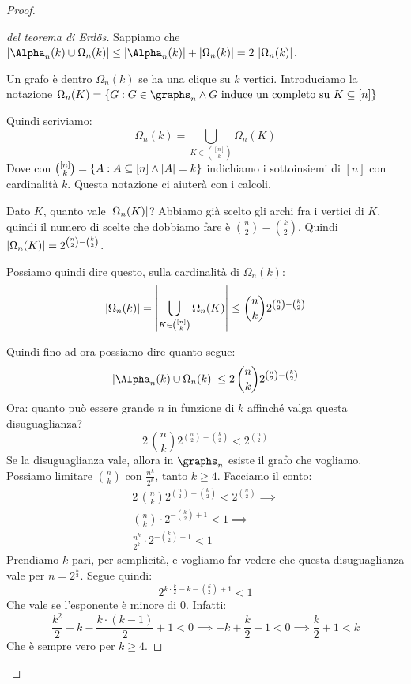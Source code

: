 \begin{proof}
\begin{proof}[del teorema di Erd\"os]
		Sappiamo che $\abs{\Alpha_n (k) \cup \Omega_n (k)} \le \abs{\Alpha_n (k)} + \abs{\Omega_n (k)} = 2 \, \abs{\Omega_n (k)}$.

		Un grafo \`e dentro $\Omega_n (k)$ se ha una clique su $k$ vertici.
		Introduciamo la notazione $\Omega_n (K) = \{ G : G \in \graphs_n \land G \text{ induce un completo su } K \subseteq [n] \}$

		Quindi scriviamo:
		\[
			\Omega_n (k) = \bigcup_{K \in \binom{[n]}{k}} \Omega_n (K)
		\]
		Dove con $\binom{[n]}{k} = \{ A : A \subseteq [n] \land \left\lvert{A}\right\rvert = k \}$ indichiamo i sottoinsiemi di $[n]$ con cardinalit\`a $k$.
		Questa notazione ci aiuter\`a con i calcoli.

		Dato $K$, quanto vale $\left\lvert{\Omega_n (K)}\right\rvert$?
		Abbiamo gi\`a scelto gli archi fra i vertici di $K$, quindi il numero di scelte che dobbiamo fare \`e $\binom{n}{2} - \binom{k}{2}$.
		Quindi $\left\lvert{\Omega_n (K)}\right\rvert = 2^{\binom{n}{2} - \binom{k}{2}}$.

		Possiamo quindi dire questo, sulla cardinalit\`a di $\Omega_n (k)$:
		\[
			\left\lvert{\Omega_n (k)}\right\rvert = \left\lvert{\bigcup_{K \in \binom{[n]}{k}} \Omega_n (K)}\right\rvert \le
			\binom{n}{k} 2^{\binom{n}{2} - \binom{k}{2}}
		\]

		Quindi fino ad ora possiamo dire quanto segue:
		\[
			\abs{\Alpha_n (k) \cup \Omega_n (k)} \le 2 \, \binom{n}{k} 2^{\binom{n}{2} - \binom{k}{2}}
		\]
		Ora: quanto pu\`o essere grande $n$ in funzione di $k$ affinch\'e valga questa disuguaglianza?
		\[
			2 \, \binom{n}{k} 2^{\binom{n}{2} - \binom{k}{2}} < 2^{\binom{n}{2}}
		\]
		Se la disuguaglianza vale, allora in $\graphs_n$ esiste il grafo che vogliamo.
		Possiamo limitare $\binom{n}{k}$ con $\frac{n^k}{2^k}$, tanto $k \ge 4$.
		Facciamo il conto:
		\begin{align*}
			2 \, \binom{n}{k} 2^{\binom{n}{2} - \binom{k}{2}} < 2^{\binom{n}{2}} \implies \\
			\binom{n}{k} \cdot 2^{- \binom{k}{2} + 1} < 1 \implies \\
			\frac{n^k}{2^k} \cdot 2^{- \binom{k}{2} + 1} < 1
		\end{align*}
		Prendiamo $k$ pari, per semplicit\`a, e vogliamo far vedere che questa disuguaglianza vale per $n = 2^{\frac{k}{2}}$.
		Segue quindi:
		\[
			2^{k \cdot \frac{k}{2} - k - \binom{k}{2} + 1} < 1
		\]
		Che vale se l'esponente \`e minore di $0$.
		Infatti:
		\[
			\frac{k^2}{2} - k - \frac{k \cdot (k - 1)}{2} + 1 < 0 \implies
			- k + \frac{k}{2} + 1 < 0 \implies
			\frac{k}{2} + 1 < k
		\]
		Che \`e sempre vero per $k \ge 4$.
	\end{proof}


\end{proof}
